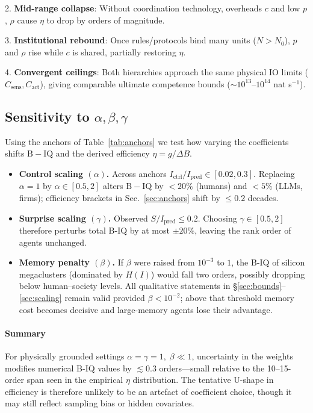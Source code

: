 \documentclass[10pt,conference]{IEEEtran}
\begin{document}
2. \textbf{Mid-range collapse}: Without coordination technology, overheads $c$ and low $p$, $\rho$ cause $\eta$ to drop by orders of magnitude.

3. \textbf{Institutional rebound}: Once rules/protocols bind many units ($N > N_0$), $p$ and $\rho$ rise while $c$ is shared, partially restoring $\eta$.

4. \textbf{Convergent ceilings}: Both hierarchies approach the same physical IO limits ($C_{\text{sens}}, C_{\text{act}}$), giving comparable ultimate competence bounds ($\sim 10^{13}$--$10^{14}$ nat s$^{-1}$).

\subsection{Sensitivity to \texorpdfstring{$\alpha,\beta,\gamma$}{(alpha,beta,gamma)}}
\label{sec:sens}
Using the anchors of Table~\ref{tab:anchors} we test how varying the coefficients shifts
\(\mathrm{B\!-\!IQ}\) and the derived efficiency
\(\eta=g/\!\Delta B\).

\begin{itemize}
\item \textbf{Control scaling $(\alpha)$.}  Across anchors
\(I_{\mathrm{ctrl}}\!/\!I_{\mathrm{pred}}\in[0.02,0.3]\).
Replacing $\alpha=1$ by $\alpha\in[0.5,2]$ alters
\(\mathrm{B\!-\!IQ}\) by
$<20\%$ (humans) and $<5\%$ (LLMs, firms); efficiency brackets in
Sec.~\ref{sec:anchors}
shift by $\le 0.2$ decades.

\item \textbf{Surprise scaling $(\gamma)$.}  
Observed $S/I_{\mathrm{pred}}\le0.2$.  
Choosing $\gamma\in[0.5,2]$ therefore perturbs total B-IQ by at most
$\pm20\%$, leaving the rank order of agents unchanged.

\item \textbf{Memory penalty $(\beta)$.}  
If $\beta$ were raised from $10^{-3}$ to $1$, the B-IQ of silicon
megaclusters (dominated by $H(I)$) would fall two orders, possibly
dropping below human–society levels.  
All qualitative statements in \S\ref{sec:bounds}–\ref{sec:scaling}
remain valid provided $\beta\!<\!10^{-2}$; above that threshold
memory cost becomes decisive and large-memory agents lose
their advantage.
\end{itemize}

\paragraph*{Summary}
For physically grounded settings
\(\alpha=\gamma=1,\;\beta\!\ll\!1\),
uncertainty in the weights modifies numerical B-IQ values by
$\lesssim 0.3$ orders—small relative to the 10–15-order span seen in
the empirical $\eta$ distribution.
The tentative U-shape in efficiency is therefore
unlikely to be an artefact of coefficient choice, though it may still
reflect sampling bias or hidden covariates.
\end{document}
